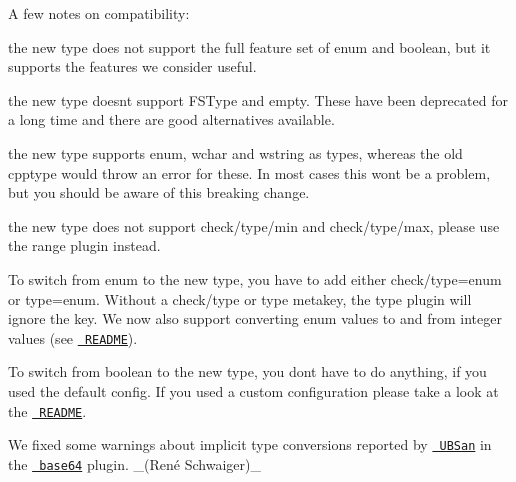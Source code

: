 A few notes on compatibility\+:


\begin{DoxyItemize}
\item the new {\ttfamily type} does not support the full feature set of {\ttfamily enum} and {\ttfamily boolean}, but it supports the features we consider useful.
\item the new {\ttfamily type} doesn\textquotesingle{}t support {\ttfamily F\+S\+Type} and {\ttfamily empty}. These have been deprecated for a long time and there are good alternatives available.
\item the new {\ttfamily type} supports {\ttfamily enum}, {\ttfamily wchar} and {\ttfamily wstring} as types, whereas the old {\ttfamily cpptype} would throw an error for these. In most cases this won\textquotesingle{}t be a problem, but you should be aware of this breaking change.
\item the new {\ttfamily type} does not support {\ttfamily check/type/min} and {\ttfamily check/type/max}, please use the {\ttfamily range} plugin instead.
\end{DoxyItemize}

To switch from {\ttfamily enum} to the new {\ttfamily type}, you have to add either {\ttfamily check/type=enum} or {\ttfamily type=enum}. Without a {\ttfamily check/type} or {\ttfamily type} metakey, the {\ttfamily type} plugin will ignore the key. We now also support converting enum values to and from integer values (see \href{https://www.libelektra.org/plugins/type}{\texttt{ R\+E\+A\+D\+ME}}).

To switch from {\ttfamily boolean} to the new {\ttfamily type}, you don\textquotesingle{}t have to do anything, if you used the default config. If you used a custom configuration please take a look at the \href{https://www.libelektra.org/plugins/type}{\texttt{ R\+E\+A\+D\+ME}}.


\begin{DoxyItemize}
\item We fixed some warnings about implicit type conversions reported by \href{https://clang.llvm.org/docs/UndefinedBehaviorSanitizer.html}{\texttt{ U\+B\+San}} in the \href{https://www.libelektra.org/plugins/base64}{\texttt{ base64}} plugin. \+\_\+(René Schwaiger)\+\_\+
\end{DoxyItemize}


